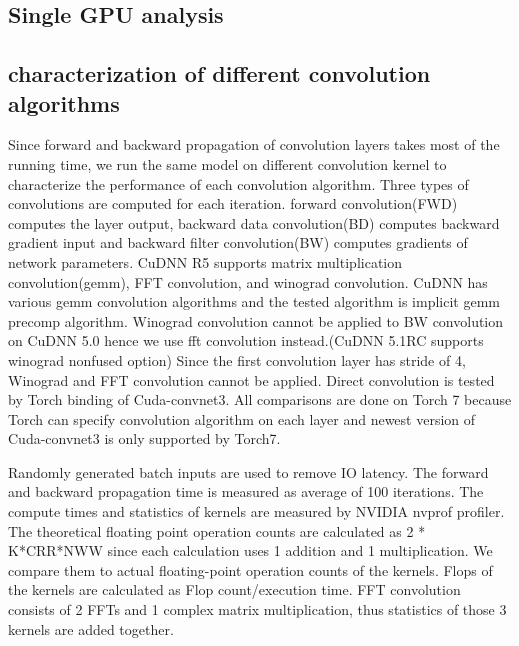 \documentclass[conference]{IEEEtran}
\begin{document}
\subsection{Single GPU analysis}


\subsection{characterization of different convolution algorithms}
Since forward and backward propagation of convolution layers takes most of the running time, we run the same model on different convolution kernel to characterize the performance of each convolution algorithm.
Three types of convolutions are computed for each iteration.
forward convolution(FWD) computes the layer output, backward data convolution(BD) computes backward gradient input and backward filter convolution(BW) computes gradients of network parameters.
CuDNN R5 supports matrix multiplication convolution(gemm), FFT convolution, and winograd convolution.
CuDNN has various gemm convolution algorithms and the tested algorithm is implicit gemm precomp algorithm.
Winograd convolution cannot be applied to BW convolution on CuDNN 5.0 hence we use fft convolution instead.(CuDNN 5.1RC supports winograd nonfused option)
Since the first convolution layer has stride of 4, Winograd and FFT convolution cannot be applied.
Direct convolution is tested by Torch binding of Cuda-convnet3.
All comparisons are done on Torch 7 because Torch can specify convolution algorithm on each layer and newest version of Cuda-convnet3 is only supported by Torch7.

Randomly generated batch inputs are used to remove IO latency.
The forward and backward propagation time is measured as average of 100 iterations.
The compute times and statistics of kernels are measured by NVIDIA nvprof profiler.
The theoretical floating point operation counts are calculated as 2 * K*CRR*NWW since each calculation uses 1 addition and 1 multiplication.
We compare them to actual floating-point operation counts of the kernels.
Flops of the kernels are calculated as Flop count/execution time.
FFT convolution consists of 2 FFTs and 1 complex matrix multiplication, thus statistics of those 3 kernels are added together.
\end{document}
